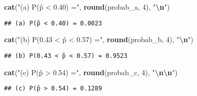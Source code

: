 \documentclass[
]{article}
\newenvironment{Shaded}{\begin{snugshade}}{\end{snugshade}}
\newcommand{\DecValTok}[1]{\textcolor[rgb]{0.00,0.00,0.81}{#1}}
\newcommand{\FunctionTok}[1]{\textcolor[rgb]{0.13,0.29,0.53}{\textbf{#1}}}
\newcommand{\NormalTok}[1]{#1}
\newcommand{\SpecialCharTok}[1]{\textcolor[rgb]{0.81,0.36,0.00}{\textbf{#1}}}
\newcommand{\StringTok}[1]{\textcolor[rgb]{0.31,0.60,0.02}{#1}}
\begin{document}
\begin{Shaded}
\begin{Highlighting}[]
\FunctionTok{cat}\NormalTok{(}\StringTok{"(a) P(p̂ \textless{} 0.40) ="}\NormalTok{, }\FunctionTok{round}\NormalTok{(probab\_a, }\DecValTok{4}\NormalTok{), }\StringTok{"}\SpecialCharTok{\textbackslash{}n}\StringTok{"}\NormalTok{)}
\end{Highlighting}
\end{Shaded}

\begin{verbatim}
## (a) P(p̂ < 0.40) = 0.0023
\end{verbatim}

\begin{Shaded}
\begin{Highlighting}[]
\FunctionTok{cat}\NormalTok{(}\StringTok{"(b) P(0.43 \textless{} p̂ \textless{} 0.57) ="}\NormalTok{, }\FunctionTok{round}\NormalTok{(probab\_b, }\DecValTok{4}\NormalTok{), }\StringTok{"}\SpecialCharTok{\textbackslash{}n}\StringTok{"}\NormalTok{)}
\end{Highlighting}
\end{Shaded}

\begin{verbatim}
## (b) P(0.43 < p̂ < 0.57) = 0.9523
\end{verbatim}

\begin{Shaded}
\begin{Highlighting}[]
\FunctionTok{cat}\NormalTok{(}\StringTok{"(c) P(p̂ \textgreater{} 0.54) ="}\NormalTok{, }\FunctionTok{round}\NormalTok{(probab\_c, }\DecValTok{4}\NormalTok{), }\StringTok{"}\SpecialCharTok{\textbackslash{}n\textbackslash{}n}\StringTok{"}\NormalTok{)}
\end{Highlighting}
\end{Shaded}

\begin{verbatim}
## (c) P(p̂ > 0.54) = 0.1289
\end{verbatim}
\end{document}
